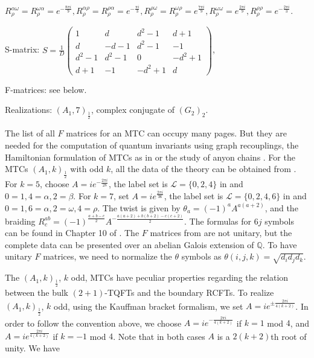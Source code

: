 \documentclass[12pt,psamsfonts]{amsart}
\newcommand{\Q}{\mathbb Q}
\newcommand{\mL}{\mathcal{L}}
\DeclareMathOperator{\SL}{SL}\DeclareMathOperator{\SU}{SU}\DeclareMathOperator{\PSL}{PSL}
\newcommand{\Z}{\mathbb Z}
\numberwithin{equation}{section}
\theoremstyle{definition}
\begin{document}
$R_{\rho}^{\alpha\omega}=R_{\rho}^{\omega\alpha}=e^{-\frac{8\pi
i}{9}}, R_{\rho}^{\alpha\rho}=R_{\rho}^{\rho\alpha}=e^{-\frac{\pi
i}3}, R_{\rho}^{\rho\omega}=R_{\rho}^{\omega\rho}=e^{\frac{7\pi
i}{9}}, R_{\rho}^{\omega\omega}=e^{\frac{2\pi i}{9}},
R_{\rho}^{\rho\rho}=e^{-\frac{2\pi i}{3}}.$

S-matrix:  $S=\frac{1}{D}\begin{pmatrix}
   1& d& d^2-1 &d+1\\
   d & -d-1& d^2-1 & -1  \\
   d^2-1 & d^2-1 & 0 &-d^2+1 \\
   d+1 &-1 &-d^2+1 & d
 \end{pmatrix}$,

F-matrices:  see below. 

Realizations: $(A_1,7)_{\frac{1}{2}}$, complex conjugate of
$(G_2)_2$.

The list of all $F$ matrices for an MTC can occupy many pages. But
they are needed for the computation of quantum invariants using
graph recouplings, the Hamiltonian formulation of MTCs as in
\cite{LW} or the study of anyon chains \cite{FTL}. For the MTCs
$(A_1,k)_{\frac{1}{2}}$ with odd $k$, all the data of the theory
can be obtained from \cite{KL}. For $k=5$, choose
$A=ie^{-\frac{2\pi i}{28}}$, the label set is $\mL=\{0,2,4\}$ in
\cite{KL} and $0=1,4=\alpha,2=\beta$. For $k=7$, set
$A=ie^{\frac{2\pi i}{36}}$, the label set is $\mL=\{0,2,4,6\}$ in
\cite{KL} and $0=1,6=\alpha,2=\omega,4=\rho$. The twist is given
by $\theta_a=(-1)^a A^{a(a+2)}$, and the braiding
$R_c^{ab}=(-1)^{\frac{a+b-c}{2}}A^{-\frac{a(a+2)+b(b+2)-c(c+2)}{2}}$.
The formulas for $6j$ symbols can be found in Chapter 10 of
\cite{KL}.  The $F$ matrices from \cite{KL} are not unitary, but
the complete data can be presented over an abelian Galois
extension of $\Q$.  To have unitary $F$ matrices, we need to
normalize the $\theta$ symbols as
$\theta(i,j,k)=\sqrt{d_id_jd_k}$.

The $(A_1,k)_{\frac{1}{2}}$, $k$ odd, MTCs have peculiar
properties regarding the relation between the bulk $(2+1)$-TQFTs
and the boundary RCFTs.  To realize $(A_1,k)_{\frac{1}{2}}$, $k$
odd, using the Kauffman bracket formalism, we set $A=ie^{\pm
\frac{2\pi i}{4(k+2)}}$. In order to
follow the convention above, we choose
$A=ie^{-\frac{2\pi i}{4(k+2)}}$ if $k=1$ mod $4$, and
$A=ie^{\frac{2\pi i}{4(k+2)}}$ if $k=-1$ mod $4$.  Note that in
both cases $A$ is a $2(k+2)$th root of unity.  We have
\end{document}
